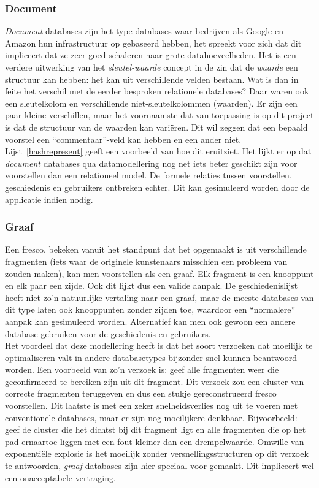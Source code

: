 \subsubsection{Document}
\emph{Document} databases zijn het type databases waar bedrijven als Google en Amazon hun infrastructuur op gebaseerd hebben, het spreekt voor zich dat dit impliceert dat ze zeer goed schaleren naar grote datahoeveelheden. Het is een verdere uitwerking van het \emph{sleutel-waarde} concept in de zin dat de \emph{waarde} een structuur kan hebben: het kan uit verschillende velden bestaan. Wat is dan in feite het verschil met de eerder besproken relationele databases? Daar waren ook een sleutelkolom en verschillende niet-sleutelkolommen (waarden). Er zijn een paar kleine verschillen, maar het voornaamste dat van toepassing is op dit project is dat de structuur van de waarden kan vari\"eren. Dit wil zeggen dat een bepaald voorstel een ``commentaar''-veld kan hebben en een ander niet. Lijst~\ref{hashrepresent} geeft een voorbeeld van hoe dit eruitziet. Het lijkt er op dat \emph{document} databases qua datamodellering nog net iets beter geschikt zijn voor voorstellen dan een relationeel model. De formele relaties tussen voorstellen, geschiedenis en gebruikers ontbreken echter. Dit kan gesimuleerd worden door de applicatie indien nodig.



\subsubsection{Graaf}
Een fresco, bekeken vanuit het standpunt dat het opgemaakt is uit verschillende fragmenten (iets waar de originele kunstenaars misschien een probleem van zouden maken), kan men voorstellen als een graaf. Elk fragment is een knooppunt en elk paar een zijde. Ook dit lijkt dus een valide aanpak. De geschiedenislijst heeft niet zo'n natuurlijke vertaling naar een graaf, maar de meeste databases van dit type laten ook knooppunten zonder zijden toe, waardoor een ``normalere'' aanpak kan gesimuleerd worden. Alternatief kan men ook gewoon een andere database gebruiken voor de geschiedenis en gebruikers.\\

Het voordeel dat deze modellering heeft is dat het soort verzoeken dat moeilijk te optimaliseren valt in andere databasetypes bijzonder snel kunnen beantwoord worden. Een voorbeeld van zo'n verzoek is: geef alle fragmenten weer die geconfirmeerd te bereiken zijn uit dit fragment. Dit verzoek zou een cluster van correcte fragmenten teruggeven en dus een stukje gereconstrueerd fresco voorstellen. Dit laatste is met een zeker snelheidsverlies nog uit te voeren met conventionele databases, maar er zijn nog moeilijkere denkbaar. Bijvoorbeeld: geef de cluster die het dichtst bij dit fragment ligt en alle fragmenten die op het pad ernaartoe liggen met een fout kleiner dan een drempelwaarde. Omwille van exponenti\"ele explosie is het moeilijk zonder versnellingsstructuren op dit verzoek te antwoorden, \emph{graaf} databases zijn hier speciaal voor gemaakt. Dit impliceert wel een onacceptabele vertraging. 

